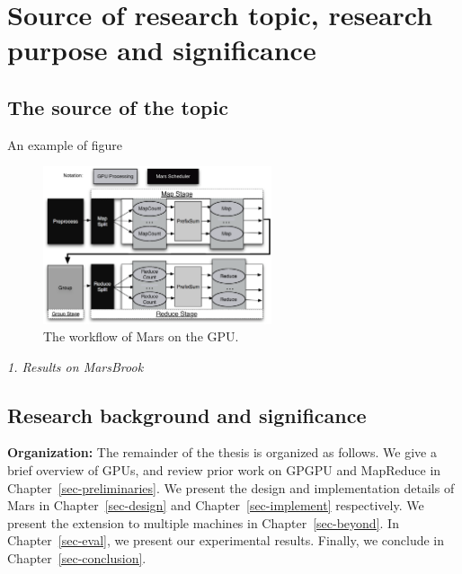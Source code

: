 \chapter{Source of research topic, research purpose and significance}\label{sec-source}

\section{The source of the topic}

An example of figure

\begin{figure}[ht]
  \centering
  \includegraphics[width=0.60\textwidth]{figure/Mars_workflow.eps}
  \caption{The workflow of Mars on the GPU. }\label{fig:MarsWorkflow}
\end{figure}

{\em 1. Results on MarsBrook}



\doublerulesep 0.1pt
\begin{table}[htb]
  \centering
\end{table}


\section{Research background and significance}

\textbf{Organization:} The remainder of the thesis is organized as
follows. We give a brief overview of GPUs, and review prior work on GPGPU and
MapReduce in Chapter~\ref{sec-preliminaries}. We present the design
and implementation details of Mars in Chapter~\ref{sec-design} and
Chapter~\ref{sec-implement} respectively. We present the extension
to multiple machines in
Chapter~\ref{sec-beyond}. In Chapter~\ref{sec-eval}, we present our
experimental results. Finally, we conclude in Chapter~\ref{sec-conclusion}.

\newpage

